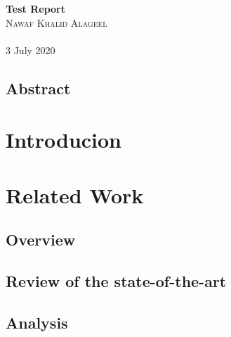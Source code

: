 \documentclass[12pt, oneside]{article}   	%
\begin{document}
\begin{titlepage}
    \begin{center}
    \huge{\bfseries Test Report}\\
    [3cm] %
    \textsc{\LARGE Nawaf Khalid Alageel}\\
    \textsc{\Large}\\ 
    [2cm]
    3 July 2020
    \end{center}
\end{titlepage}

\begin{center}
    \vspace*{\fill}
    \section*{ Abstract} %

    \vspace*{\fill}
    \cleardoublepage
\end{center}


\tableofcontents %
\thispagestyle{empty} %
\cleardoublepage


\setcounter{page}{1} 

\section{Introducion}




\newpage
\section{Related Work}
\subsection{Overview}
\subsection{Review of the state-of-the-art}
\subsection{Analysis}
\end{document}
